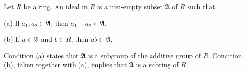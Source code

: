 Let $R$ be a ring. An ideal in $R$ is a non-empty subset $\mathfrak{A}$ of $R$ such that

(a) If $a_1, a_2 \in \mathfrak{A}$, then $a_1 - a_2 \in \mathfrak{A}$.

(b) If $a \in \mathfrak{A}$ and $b \in R$, then $ab \in \mathfrak{A}$.

Condition (a) states that $\mathfrak{A}$ is a subgroup of the additive group of $R$. Condition (b), taken together with (a), implies that $\mathfrak{A}$ is a subring of $R$.
